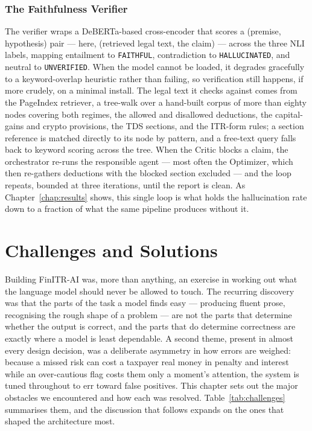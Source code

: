 \documentclass[12pt, a4paper, oneside]{report}
\begin{document}
\subsection{The Faithfulness Verifier}
The verifier wraps a DeBERTa-based cross-encoder that scores a (premise,
hypothesis) pair --- here, (retrieved legal text, the claim) --- across the three
NLI labels, mapping entailment to \texttt{FAITHFUL}, contradiction to
\texttt{HALLUCINATED}, and neutral to \texttt{UNVERIFIED}. When the model cannot
be loaded, it degrades gracefully to a keyword-overlap heuristic rather than
failing, so verification still happens, if more crudely, on a minimal install.
The legal text it checks against comes from the PageIndex retriever, a tree-walk
over a hand-built corpus of more than eighty nodes covering both regimes, the
allowed and disallowed deductions, the capital-gains and crypto provisions, the
TDS sections, and the ITR-form rules; a section reference is matched directly to
its node by pattern, and a free-text query falls back to keyword scoring across
the tree. When the Critic blocks a claim, the orchestrator re-runs the
responsible agent --- most often the Optimizer, which then re-gathers deductions
with the blocked section excluded --- and the loop repeats, bounded at three
iterations, until the report is clean. As Chapter~\ref{chap:results} shows, this
single loop is what holds the hallucination rate down to a fraction of what the
same pipeline produces without it.



\chapter{Challenges and Solutions}
\label{chap:challenges}

Building FinITR-AI was, more than anything, an exercise in working out what the
language model should never be allowed to touch. The recurring discovery was
that the parts of the task a model finds easy --- producing fluent prose,
recognising the rough shape of a problem --- are not the parts that determine
whether the output is correct, and the parts that do determine correctness are
exactly where a model is least dependable. A second theme, present in almost
every design decision, was a deliberate asymmetry in how errors are weighed:
because a missed risk can cost a taxpayer real money in penalty and interest
while an over-cautious flag costs them only a moment's attention, the system is
tuned throughout to err toward false positives. This chapter sets out the major
obstacles we encountered and how each was resolved.
Table~\ref{tab:challenges} summarises them, and the discussion that follows
expands on the ones that shaped the architecture most.
\end{document}
